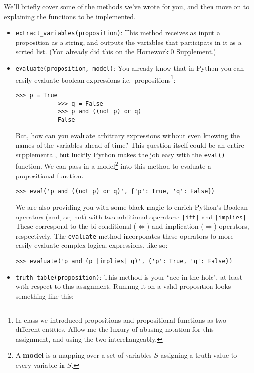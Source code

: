 \documentclass{article}
\begin{document}
    \vspace{3mm}
    We'll briefly cover some of the methods we've wrote for you, and then move on to explaining the functions to be implemented.
    \begin{itemize}
        \item \lstinline+extract_variables(proposition)+: This method receives as input a proposition as a string, and outputs the variables that participate in it as a sorted list. (You already did this on the Homework 0 Supplement.)
        \item \lstinline+evaluate(proposition, model)+: You already know that in Python you can easily evaluate boolean expressions i.e.\ propositions\footnote{In class we introduced propositions and propositional functions as two different entities. Allow me the luxury of abusing notation for this assignment, and using the two interchangeably.}:
        \begin{lstlisting}[belowskip=-10pt]
            >>> p = True
            >>> q = False
            >>> p and ((not p) or q)
            False
        \end{lstlisting}
        But, how can you evaluate arbitrary expressions without even knowing the names of the variables ahead of time? This question itself could be an entire supplemental, but luckily Python makes the job easy with the \lstinline+eval()+ function. We can pass in a model\footnote{A \textbf{model} is a mapping over a set of variables $S$ assigning a truth value to every variable in $S$.} into this method to evaluate a propositional function:
        \begin{lstlisting}[belowskip=-10pt]
            >>> eval('p and ((not p) or q)', {'p': True, 'q': False})
        \end{lstlisting}
        We are also providing you with some black magic to enrich Python’s Boolean operators (and, or, not) with two additional operators: \lstinline+|iff|+ and \lstinline+|implies|+. These correspond to the bi-conditional ($\Leftrightarrow$) and implication ($\Rightarrow$) operators, respectively. The \lstinline+evaluate+ method incorporates these operators to more easily evaluate complex logical expressions, like so:
        \begin{lstlisting}[belowskip=-10pt]
            >>> evaluate('p and (p |implies| q)', {'p': True, 'q': False})
        \end{lstlisting}
        \item \lstinline+truth_table(proposition)+: This method is your ``ace in the hole", at least with respect to this assignment. Running it on a valid proposition looks something like this:

\end{itemize}
\end{document}
